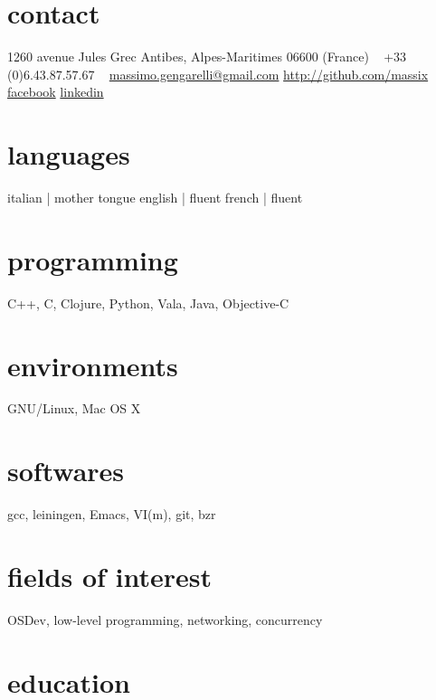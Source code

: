 \documentclass[]{friggeri-cv}
\begin{document}


\begin{aside} %
  \section{contact}
  1260 avenue Jules Grec
  Antibes, Alpes-Maritimes
  06600 (France)
  ~
  +33 (0)6.43.87.57.67
  ~
  \href{mailto:massimo.gengarelli@gmail.com}{massimo.gengarelli@gmail.com}
  \href{http://github.com/massix/}{http://github.com/massix}
  \href{http://facebook.com/massimo.gengarelli}{facebook}
  \href{http://fr.linkedin.com/pub/massimo-gengarelli/46/375/468/}{linkedin}
  \section{languages}
  italian | mother tongue
  english | fluent
  french  | fluent
  \section{programming}
  C++, C, Clojure, Python,
  Vala, Java, Objective-C
  \section{environments}
  GNU/Linux, Mac OS X
  \section{softwares}
  gcc, leiningen, Emacs,
  VI(m), git, bzr
  \section{fields of interest}
  OSDev, low-level programming,
  networking, concurrency
\end{aside}


\section{education}
\end{document}
